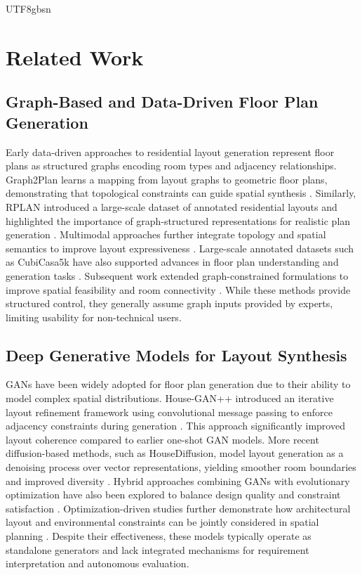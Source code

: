 \documentclass[11pt]{article}
\let\cite\citep
\providecommand\citep{\cite}
\begin{document}
\begin{CJK}{UTF8}{gbsn}
\section*{Related Work}

\subsection*{Graph-Based and Data-Driven Floor Plan Generation}

Early data-driven approaches to residential layout generation represent floor plans as structured graphs encoding room types and adjacency relationships. Graph2Plan learns a mapping from layout graphs to geometric floor plans, demonstrating that topological constraints can guide spatial synthesis \cite{b19}. Similarly, RPLAN introduced a large-scale dataset of annotated residential layouts and highlighted the importance of graph-structured representations for realistic plan generation \cite{b18}. Multimodal approaches further integrate topology and spatial semantics to improve layout expressiveness \cite{b3}. Large-scale annotated datasets such as CubiCasa5k have also supported advances in floor plan understanding and generation tasks \cite{b4}. Subsequent work extended graph-constrained formulations to improve spatial feasibility and room connectivity \cite{b2}. While these methods provide structured control, they generally assume graph inputs provided by experts, limiting usability for non-technical users.

\subsection*{Deep Generative Models for Layout Synthesis}

GANs have been widely adopted for floor plan generation due to their ability to model complex spatial distributions. House-GAN++ introduced an iterative layout refinement framework using convolutional message passing to enforce adjacency constraints during generation \cite{b16}. This approach significantly improved layout coherence compared to earlier one-shot GAN models. More recent diffusion-based methods, such as HouseDiffusion, model layout generation as a denoising process over vector representations, yielding smoother room boundaries and improved diversity \cite{b17}. Hybrid approaches combining GANs with evolutionary optimization have also been explored to balance design quality and constraint satisfaction \cite{b8}. Optimization-driven studies further demonstrate how architectural layout and environmental constraints can be jointly considered in spatial planning \cite{b14}. Despite their effectiveness, these models typically operate as standalone generators and lack integrated mechanisms for requirement interpretation and autonomous evaluation.


\end{CJK}
\end{document}
